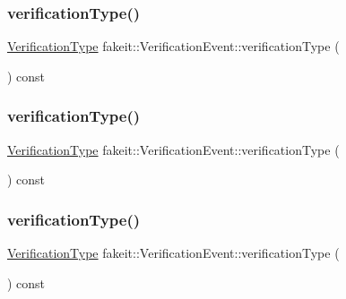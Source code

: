 \subsubsection{\texorpdfstring{verificationType()}{verificationType()}\hspace{0.1cm}{\footnotesize\ttfamily [1/9]}}
{\footnotesize\ttfamily \mbox{\hyperlink{namespacefakeit_a9df22520dd60badb149c1d1d2518b253}{Verification\+Type}} fakeit\+::\+Verification\+Event\+::verification\+Type (\begin{DoxyParamCaption}{ }\end{DoxyParamCaption}) const\hspace{0.3cm}{\ttfamily [inline]}}

\mbox{\label{structfakeit_1_1VerificationEvent_a8b06372b0691ff1f6f2c4f59f5b05922}} 
\subsubsection{\texorpdfstring{verificationType()}{verificationType()}\hspace{0.1cm}{\footnotesize\ttfamily [2/9]}}
{\footnotesize\ttfamily \mbox{\hyperlink{namespacefakeit_a9df22520dd60badb149c1d1d2518b253}{Verification\+Type}} fakeit\+::\+Verification\+Event\+::verification\+Type (\begin{DoxyParamCaption}{ }\end{DoxyParamCaption}) const\hspace{0.3cm}{\ttfamily [inline]}}

\mbox{\label{structfakeit_1_1VerificationEvent_a8b06372b0691ff1f6f2c4f59f5b05922}} 
\subsubsection{\texorpdfstring{verificationType()}{verificationType()}\hspace{0.1cm}{\footnotesize\ttfamily [3/9]}}
{\footnotesize\ttfamily \mbox{\hyperlink{namespacefakeit_a9df22520dd60badb149c1d1d2518b253}{Verification\+Type}} fakeit\+::\+Verification\+Event\+::verification\+Type (\begin{DoxyParamCaption}{ }\end{DoxyParamCaption}) const\hspace{0.3cm}{\ttfamily [inline]}}

